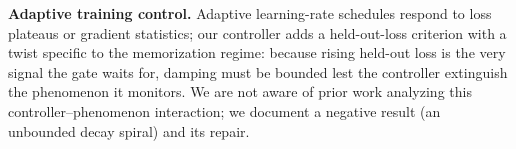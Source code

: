 \textbf{Adaptive training control.} Adaptive learning-rate schedules
respond to loss plateaus or gradient statistics; our controller adds a
held-out-loss criterion with a twist specific to the memorization
regime: because rising held-out loss is the very signal the gate waits
for, damping must be bounded lest the controller extinguish the
phenomenon it monitors. We are not aware of prior work analyzing this
controller--phenomenon interaction; we document a negative result (an
unbounded decay spiral) and its repair.
